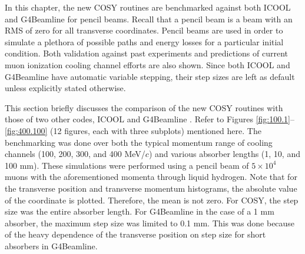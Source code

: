 \par In this chapter, the new COSY routines are benchmarked against both ICOOL and G4Beamline for pencil beams. Recall that a pencil beam is a beam with an RMS of zero for all transverse coordinates. Pencil beams are used in order to simulate a plethora of possible paths and energy losses for a particular initial condition. Both validation against past experiments and predictions of current muon ionization cooling channel efforts are also shown. Since both ICOOL and G4Beamline have automatic variable stepping, their step sizes are left as default unless explicitly stated otherwise.

\label{sec:benchmark}

This section briefly discusses the comparison of the new COSY routines with those of two other codes, ICOOL \cite{icool} and G4Beamline \cite{g4bl}. Refer to Figures \ref{fig:100.1}--\ref{fig:400.100} (12 figures, each with three subplots) mentioned here. The benchmarking was done over both the typical momentum range of cooling channels (100, 200, 300, and 400 MeV/$c$) and various absorber lengths (1, 10, and 100 mm). These simulations were performed using a pencil beam of $5\times 10^4$ muons with the aforementioned momenta through liquid hydrogen. Note that for the transverse position and transverse momentum histograms, the absolute value of the coordinate is plotted. Therefore, the mean is not zero. For COSY, the step size was the entire absorber length. For G4Beamline in the case of a 1 mm absorber, the maximum step size was limited to 0.1 mm. This was done because of the heavy dependence of the transverse position on step size for short absorbers in G4Beamline.
\newpage
